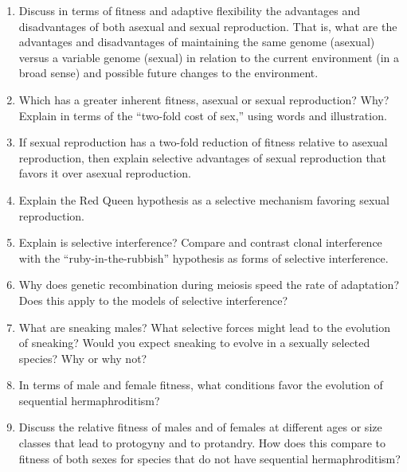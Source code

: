 \documentclass[letterpaper]{tufte-handout}
\begin{document}
\begin{enumerate}
	
	\item Discuss in terms of fitness and adaptive flexibility the advantages and disadvantages of both asexual and sexual reproduction. That is, what are the advantages and disadvantages of maintaining the same genome (asexual) versus a variable genome (sexual) in relation to the current environment (in a broad sense) and possible future changes to the environment.

	\item Which has a greater inherent fitness, asexual or sexual reproduction?  Why?  Explain in terms of the ``two-fold cost of sex,'' using words and illustration. 

	\item If sexual reproduction has a two-fold reduction of fitness relative to asexual reproduction, then explain selective advantages of sexual reproduction that favors it over asexual reproduction.
	
	\item Explain the Red Queen hypothesis as a selective mechanism favoring sexual reproduction.
	
	\item Explain is selective interference? Compare and contrast clonal interference with the “ruby-in-the-rubbish” hypothesis as forms of selective interference.
	
	\item Why does genetic recombination during meiosis speed the rate of adaptation? Does this apply to the models of selective interference?

	\item What are sneaking males?  What selective forces might lead to the evolution of sneaking?  Would you expect sneaking to evolve in a sexually selected species?  Why or why not?

	\item In terms of male and female fitness, what conditions favor the evolution of sequential hermaphroditism?

	\item Discuss the relative fitness of males and of females at different ages or size classes that lead to protogyny and to protandry.  How does this compare to fitness of both sexes for species that do not have sequential hermaphroditism? 


\end{enumerate}
\end{document}

